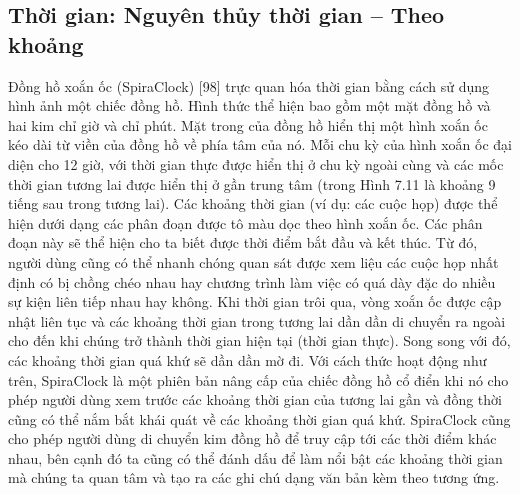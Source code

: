 \subsection{Thời gian: Nguyên thủy thời gian – Theo khoảng}
Đồng hồ xoắn ốc (SpiraClock) [98] trực quan hóa thời gian bằng cách sử dụng hình ảnh một chiếc đồng hồ. Hình thức thể hiện bao gồm một mặt đồng hồ và hai kim chỉ giờ và chỉ phút. Mặt trong của đồng hồ hiển thị một hình xoắn ốc kéo dài từ viền của đồng hồ về phía tâm của nó. Mỗi chu kỳ của hình xoắn ốc đại diện cho 12 giờ, với thời gian thực được hiển thị ở chu kỳ ngoài cùng và các mốc thời gian tương lai được hiển thị ở gần trung tâm (trong Hình 7.11 là khoảng 9 tiếng sau trong tương lai). Các khoảng thời gian (ví dụ: các cuộc họp) được thể hiện dưới dạng các phân đoạn được tô màu dọc theo hình xoắn ốc. Các phân đoạn này sẽ thể hiện cho ta biết được thời điểm bắt đầu và kết thúc. Từ đó, người dùng cũng có thể nhanh chóng quan sát được xem liệu các cuộc họp nhất định có bị chồng chéo nhau hay chương trình làm việc có quá dày đặc do nhiều sự kiện liên tiếp nhau hay không. Khi thời gian trôi qua, vòng xoắn ốc được cập nhật liên tục và các khoảng thời gian trong tương lai dần dần di chuyển ra ngoài cho đến khi chúng trở thành thời gian hiện tại (thời gian thực). Song song với đó, các khoảng thời gian quá khứ sẽ dần dần mờ đi. Với cách thức hoạt động như trên, SpiraClock là một phiên bản nâng cấp của chiếc đồng hồ cổ điển khi nó cho phép người dùng xem trước các khoảng thời gian của tương lai gần và đồng thời cũng có thể nắm bắt khái quát về các khoảng thời gian quá khứ. SpiraClock cũng cho phép người dùng di chuyển kim đồng hồ để truy cập tới các thời điểm khác nhau, bên cạnh đó ta cũng có thể đánh dấu để làm nổi bật các khoảng thời gian mà chúng ta quan tâm và tạo ra các ghi chú dạng văn bản kèm theo tương ứng.
